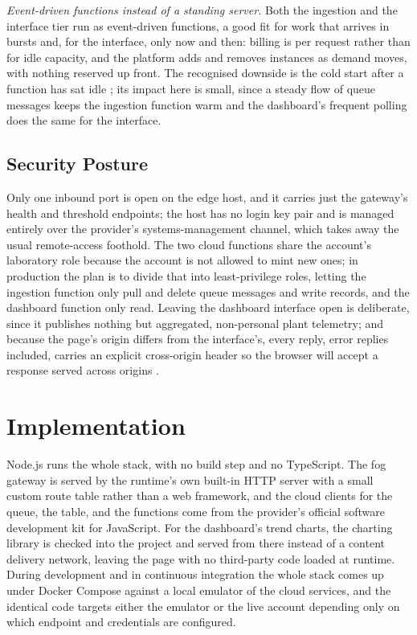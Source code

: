 \documentclass[conference]{IEEEtran}
\begin{document}
\textit{Event-driven functions instead of a standing server.} Both the ingestion and the interface tier run as event-driven functions, a good fit for work that arrives in bursts and, for the interface, only now and then: billing is per request rather than for idle capacity, and the platform adds and removes instances as demand moves, with nothing reserved up front. The recognised downside is the cold start after a function has sat idle \cite{wang2018}; its impact here is small, since a steady flow of queue messages keeps the ingestion function warm and the dashboard's frequent polling does the same for the interface.

\subsection{Security Posture}

Only one inbound port is open on the edge host, and it carries just the gateway's health and threshold endpoints; the host has no login key pair and is managed entirely over the provider's systems-management channel, which takes away the usual remote-access foothold. The two cloud functions share the account's laboratory role because the account is not allowed to mint new ones; in production the plan is to divide that into least-privilege roles, letting the ingestion function only pull and delete queue messages and write records, and the dashboard function only read. Leaving the dashboard interface open is deliberate, since it publishes nothing but aggregated, non-personal plant telemetry; and because the page's origin differs from the interface's, every reply, error replies included, carries an explicit cross-origin header so the browser will accept a response served across origins \cite{barth2011}.

\section{Implementation}

Node.js runs the whole stack, with no build step and no TypeScript. The fog gateway is served by the runtime's own built-in HTTP server with a small custom route table rather than a web framework, and the cloud clients for the queue, the table, and the functions come from the provider's official software development kit for JavaScript. For the dashboard's trend charts, the charting library is checked into the project and served from there instead of a content delivery network, leaving the page with no third-party code loaded at runtime. During development and in continuous integration the whole stack comes up under Docker Compose against a local emulator of the cloud services, and the identical code targets either the emulator or the live account depending only on which endpoint and credentials are configured.
\end{document}
